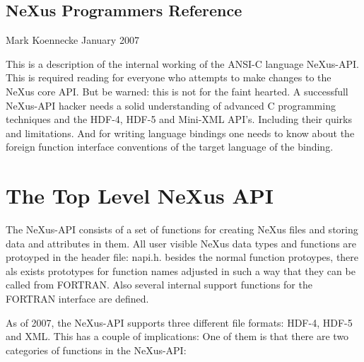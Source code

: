 \documentclass[a4paper]{article}
\begin{document}
\begin{center}
\section{NeXus Programmers Reference }\label{NeXusIntern}

Mark Koennecke\linebreak
January 2007
\end{center}


This is a description of the internal working of the ANSI-C language NeXus-API.
This is required reading for everyone who attempts to make changes to the 
NeXus core API. But be warned: this is not for the faint hearted. A successfull 
NeXus-API hacker needs a solid understanding of advanced C programming techniques 
and the HDF-4, HDF-5 and Mini-XML API's. Including their quirks and limitations.
And for writing language bindings one needs to know about the foreign function 
interface conventions of the target language of the binding.      
 


\section{The Top Level NeXus API }
The NeXus-API consists of a set of functions for creating NeXus files and storing 
data and attributes in them. All user visible NeXus data types and functions are 
protoyped in the header file: napi.h. besides the normal function protoypes, there 
als exists prototypes for function names adjusted in such a way that they can 
be called from FORTRAN. Also several internal support functions for the FORTRAN 
interface are defined.   


As of 2007, the NeXus-API supports three different file 
formats: HDF-4, HDF-5 and XML. This has a couple of implications:
One of them is that there are two categories of functions in the NeXus-API:
\end{document}
